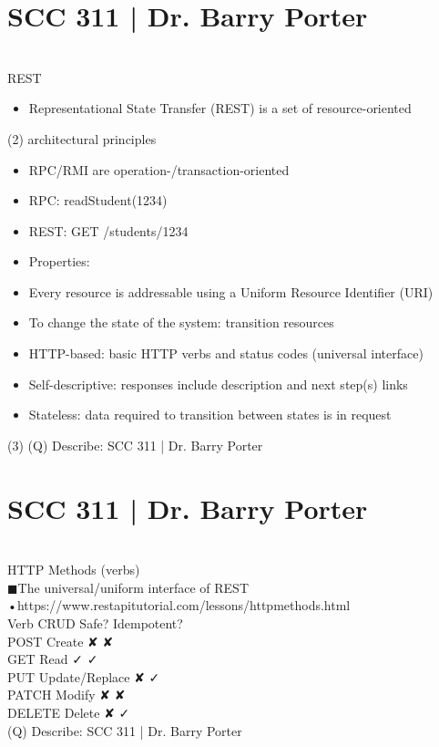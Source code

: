 \documentclass[12pt]{article}
\begin{document}
\section{SCC 311 | Dr. Barry Porter}
\\
REST\\
\begin{itemize}
  \item Representational State Transfer (REST) is a set of resource-oriented
\end{itemize}(2)
architectural principles\\
\begin{itemize}
  \item RPC/RMI are operation-/transaction-oriented
  \item RPC: readStudent(1234)
  \item REST: GET /students/1234
  \item Properties:
  \item Every resource is addressable using a Uniform Resource Identifier (URI)
  \item To change the state of the system: transition resources
  \item HTTP-based: basic HTTP verbs and status codes (universal interface)
  \item Self-descriptive: responses include description and next step(s) links
  \item Stateless: data required to transition between states is in request
\end{itemize}(3)
\clearpage
(Q)
Describe: SCC 311 | Dr. Barry Porter
\clearpage
\section{SCC 311 | Dr. Barry Porter}
\\
HTTP Methods (verbs)\\
◼The universal/uniform interface of REST\\
•https://www.restapitutorial.com/lessons/httpmethods.html\\
Verb CRUD Safe? Idempotent?\\
POST Create ✘ ✘\\
GET Read ✓ ✓\\
PUT Update/Replace ✘ ✓\\
PATCH Modify ✘ ✘\\
DELETE Delete ✘ ✓\\
\clearpage
(Q)
Describe: SCC 311 | Dr. Barry Porter
\clearpage
\end{document}
